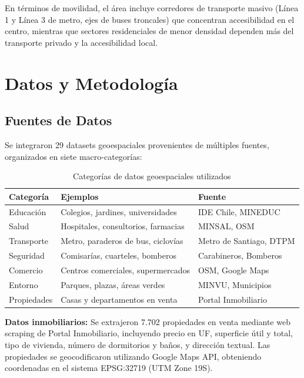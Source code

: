 \documentclass[11pt,letterpaper]{article}
\begin{document}
En términos de movilidad, el área incluye corredores de transporte masivo (Línea 1 y Línea 3 de metro, ejes de buses troncales) que concentran accesibilidad en el centro, mientras que sectores residenciales de menor densidad dependen más del transporte privado y la accesibilidad local.

\newpage
\section{Datos y Metodología}

\subsection{Fuentes de Datos}

Se integraron 29 datasets geoespaciales provenientes de múltiples fuentes, organizados en siete macro-categorías:

\begin{table}[H]
\centering
\caption{Categorías de datos geoespaciales utilizados}
\label{tab:categorias_datos}
\begin{tabular}{@{}lll@{}}
\toprule
\textbf{Categoría} & \textbf{Ejemplos} & \textbf{Fuente} \\
\midrule
Educación & Colegios, jardines, universidades & IDE Chile, MINEDUC \\
Salud & Hospitales, consultorios, farmacias & MINSAL, OSM \\
Transporte & Metro, paraderos de bus, ciclovías & Metro de Santiago, DTPM \\
Seguridad & Comisarías, cuarteles, bomberos & Carabineros, Bomberos \\
Comercio & Centros comerciales, supermercados & OSM, Google Maps \\
Entorno & Parques, plazas, áreas verdes & MINVU, Municipios \\
Propiedades & Casas y departamentos en venta & Portal Inmobiliario \\
\bottomrule
\end{tabular}
\end{table}

\textbf{Datos inmobiliarios:} Se extrajeron 7.702 propiedades en venta mediante web scraping de Portal Inmobiliario, incluyendo precio en UF, superficie útil y total, tipo de vivienda, número de dormitorios y baños, y dirección textual. Las propiedades se geocodificaron utilizando Google Maps API, obteniendo coordenadas en el sistema EPSG:32719 (UTM Zone 19S).
\end{document}
